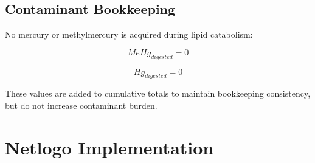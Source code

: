 \documentclass[
]{book}
\begin{document}
\subsection{Contaminant Bookkeeping}\label{contaminant-bookkeeping}

No mercury or methylmercury is acquired during lipid catabolism:

\[
MeHg_{digested} = 0
\]

\[
Hg_{digested} = 0
\]

These values are added to cumulative totals to maintain bookkeeping consistency, but do not increase contaminant burden.

\section{Netlogo Implementation}\label{netlogo-implementation-6}
\end{document}
